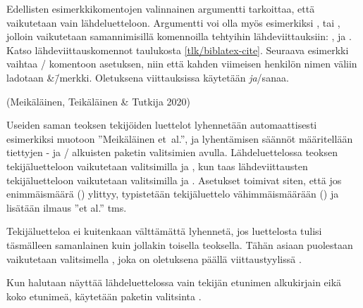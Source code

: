Edellisten esimerkkikomentojen valinnainen argumentti 
tarkoittaa, että vaikutetaan vain lähdeluetteloon. Argumentti voi olla
myös esimerkiksi ,  tai ,
jolloin vaikutetaan samannimisillä komennoilla tehtyihin
lähdeviittauksiin: ,  ja
. Katso lähdeviittauskomennot taulukosta
\ref{tlk/biblatex-cite}. Seuraava esimerkki vaihtaa
\-/ komentoon asetuksen, niin että kahden viimeisen
henkilön nimen väliin ladotaan \&\=/merkki. Oletuksena viittauksissa
käytetään \textit{ja}\-/sanaa.

\begin{koodilohkosis}
\end{koodilohkosis}

\begin{tulossis}
  (Meikäläinen, Teikäläinen \& Tutkija 2020)
\end{tulossis}

\noindent
Useiden saman teoksen tekijöiden luettelot lyhennetään automaattisesti
esimerkiksi muotoon ''Meikäläinen et~al.'', ja lyhentämisen säännöt
määritellään tiettyjen - ja \-/ alkuisten paketin
valitsimien avulla. Lähdeluettelossa teoksen tekijäluetteloon
vaikutetaan valitsimilla  ja
, kun taas lähdeviittausten tekijäluetteloon
vaikutetaan valitsimilla  ja
. Asetukset toimivat siten, että jos
enimmäismäärä () ylittyy, typistetään tekijäluettelo
vähimmäismäärään () ja lisätään ilmaus ''et al.'' tms.

Tekijäluetteloa ei kuitenkaan välttämättä lyhennetä, jos luettelosta
tulisi täsmälleen samanlainen kuin jollakin toisella teoksella. Tähän
asiaan puolestaan vaikutetaan valitsimella , joka on
oletuksena päällä viittaustyylissä .

\begin{koodilohkosis}
\usepackage[style=authoryear, maxbibnames=99, minbibnames=3,
  maxcitenames=3, mincitenames=1, uniquelist=true]{biblatex}
\end{koodilohkosis}

\noindent
Kun halutaan näyttää lähdeluettelossa vain tekijän etunimen alkukirjain
eikä koko etunimeä, käytetään paketin valitsinta .

